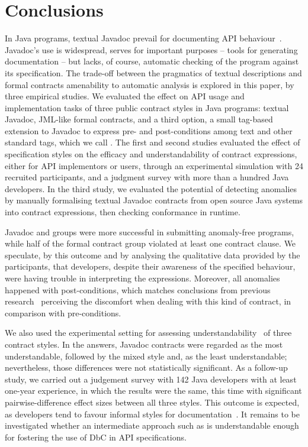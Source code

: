 \section{Conclusions}
\label{sec:conclusions}

In Java programs, textual Javadoc prevail for documenting API behaviour~\cite{docAnalysis}.
Javadoc's use is widespread, serves for important purposes -- tools for generating documentation -- but lacks, of course, automatic checking of the program against its specification.
The trade-off between the pragmatics of textual descriptions and formal contracts amenability to automatic analysis is explored in this paper, by three empirical studies.
We evaluated the effect on API usage and implementation tasks of three public contract styles in Java programs: textual Javadoc, JML-like formal contracts, and a third option, a small tag-based extension to Javadoc to express pre- and post-conditions among text and other standard tags, which we call \contractjdoc{}.
The first and second studies evaluated the effect of specification styles on the efficacy and understandability of contract expressions, either for API implementors or users, through an experimental simulation with 24 recruited participants, and a judgment survey with more than a hundred Java developers.
In the third study, we evaluated the potential of detecting anomalies by manually formalising textual Javadoc contracts from open source Java systems into contract expressions, then checking conformance in runtime.


Javadoc and \contractjdoc{} groups were more successful in submitting anomaly-free programs, while half of the formal contract group violated at least one contract clause. 
We speculate, by this outcome and by analysing the qualitative data provided by the participants, that developers, despite their awareness of the specified behaviour, were having trouble in interpreting the expressions.  
Moreover, all anomalies happened with post-conditions, which matches conclusions from previous research~\cite{Estler-etal14,sac2017} perceiving the discomfort when dealing with this kind of contract, in comparison with pre-conditions. 


We also used the experimental setting for assessing understandability~\cite{Scalabrino2017} of three contract styles. 
In the answers, Javadoc contracts were regarded as the most understandable, followed by the mixed \contractjdoc{} style and, as the least understandable; nevertheless, those differences were not statistically significant. As a follow-up study, we carried out a judgement survey with 142 Java developers with at least one-year experience, in which the results were the same, this time with significant pairwise-difference effect sizes between all three styles.
This outcome is expected, as developers tend to favour informal styles for documentation~\cite{Polikarpova-etal09}. It remains to be investigated whether an intermediate approach such as \contractjdoc{} is understandable enough for fostering the use of DbC in API specifications.

